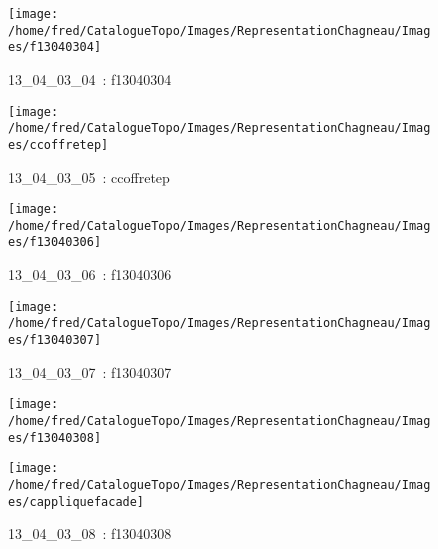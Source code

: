 \documentclass[12pt,titlepage]{book}
\begin{document}
\begin{figure}[h!]
  \begin{minipage}[t]{3cm}
    \begin{center}
      \texttt{[image: /home/fred/CatalogueTopo/Images/RepresentationChagneau/Images/f13040304]}
      \caption[~13\_04\_03\_04]{\small{13\_04\_03\_04~:} \tiny{f13040304}}\label{f13040304}
    \end{center}
  \end{minipage}
  \begin{minipage}[t]{3cm}
    \begin{center}
      \texttt{[image: /home/fred/CatalogueTopo/Images/RepresentationChagneau/Images/ccoffretep]}
      \caption[~13\_04\_03\_05]{\small{13\_04\_03\_05~:} \tiny{ccoffretep}}\label{ccoffretep}
    \end{center}
  \end{minipage}
  \begin{minipage}[t]{3cm}
    \begin{center}
      \texttt{[image: /home/fred/CatalogueTopo/Images/RepresentationChagneau/Images/f13040306]}
      \caption[~13\_04\_03\_06]{\small{13\_04\_03\_06~:} \tiny{f13040306}}\label{f13040306}
    \end{center}
  \end{minipage}
  \begin{minipage}[t]{3cm}
    \begin{center}
      \texttt{[image: /home/fred/CatalogueTopo/Images/RepresentationChagneau/Images/f13040307]}
      \caption[~13\_04\_03\_07]{\small{13\_04\_03\_07~:} \tiny{f13040307}}\label{f13040307}
    \end{center}
  \end{minipage}
  \begin{minipage}[t]{3cm}
    \begin{center}
      \texttt{[image: /home/fred/CatalogueTopo/Images/RepresentationChagneau/Images/f13040308]}
      \caption[~13\_04\_03\_08]{\small{13\_04\_03\_08~:} \tiny{f13040308}}\label{f13040308}
    \end{center}
  \end{minipage}
  \begin{minipage}[t]{3cm}
    \begin{center}
      \texttt{[image: /home/fred/CatalogueTopo/Images/RepresentationChagneau/Images/cappliquefacade]}

\end{center}
\end{minipage}
\end{figure}
\end{document}
